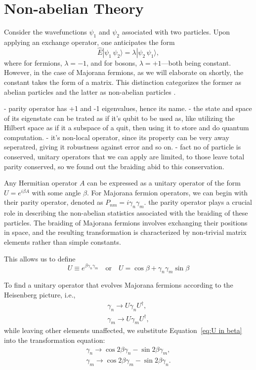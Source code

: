 \documentclass{article}
\begin{document}
\section{Non-abelian Theory} %
\label{sec:Non-abelian Theory}

Consider the wavefunctions $ \psi_1 $ and $ \psi_2 $ associated with two particles. Upon applying an exchange operator, one anticipates the form
\begin{equation}
	\hat{E} | \psi_1\, \psi_2 \rangle = \lambda | \psi_2\, \psi_1 \rangle,
\end{equation}
where for fermions, $ \lambda = -1 $, and for bosons, $ \lambda = +1 $—both being constant. However, in the case of Majorana fermions, as we will elaborate on shortly, the constant takes the form of a matrix. This distinction categorizes the former as abelian particles and the latter as non-abelian particles \cite{Nayak_2008}.

- parity operator has +1 and -1 eigenvalues, hence its name. 
- the state and space of its eigenstate can be trated as if it's qubit to be used as, like utilizing the Hilbert space as if it a subspace of a quit, then using it to store and do quantum computation.
- it's non-local operator, since its property can be very away seperatred, giving it robustness against error and so on.
- fact no of particle is conserved, unitary operators that we can apply are limited, to those leave total parity conserved, so we found out the braiding abid to this conservation.

Any Hermitian operator $ A $ can be expressed as a unitary operator of the form $ U = e^{i\beta A} $ with some angle $ \beta $. For Majorana fermion operators, we can begin with their parity operator, denoted as $ P_{nm} = i \gamma_n \gamma_m $. 
the parity operator plays a crucial role in describing the non-abelian statistics associated with the braiding of these particles. The braiding of Majorana fermions involves exchanging their positions in space, and the resulting transformation is characterized by non-trivial matrix elements rather than simple constants.

This allows us to define
\begin{equation}
	U \equiv e^{\beta \gamma_n \gamma_m} \quad \text{or} \quad U = \cos{\beta} + \gamma_n \gamma_m \sin{\beta}
	\label{eq:U in beta}
\end{equation}

To find a unitary operator that evolves Majorana fermions according to the Heisenberg picture, i.e., 
$$
	\begin{aligned}
		\gamma_n \rightarrow U \gamma_n U ^\dagger, \\
		\gamma_m \rightarrow U \gamma_m U ^\dagger,
	\end{aligned}
$$
while leaving other elements unaffected, we substitute Equation~\ref{eq:U in beta} into the transformation equation:
$$
	\begin{aligned}
		\gamma_n \rightarrow \cos{2 \beta} \gamma_n - \sin{2 \beta} \gamma_m, \\
		\gamma_m \rightarrow \cos{2 \beta} \gamma_m - \sin{2 \beta} \gamma_n.
		\label{eq:subst in transformation}
	\end{aligned}
$$
\end{document}
